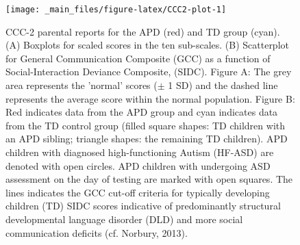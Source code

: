 \documentclass[a4paper, twoside]{templates/ociamthesis}
\begin{document}
\begin{figure}

{\centering \texttt{[image: \_main\_files/figure-latex/CCC2-plot-1]} 

}

\caption{CCC-2 parental reports for the APD (red) and TD group (cyan). (A) Boxplots for scaled scores in the ten sub-scales. (B) Scatterplot for General Communication Composite (GCC) as a function of Social-Interaction Deviance Composite, (SIDC). Figure A: The grey area represents the 'normal' scores ($\pm$ 1 SD) and the dashed line represents the average score within the normal population. Figure B: Red indicates data from the APD group and cyan indicates data from the TD control group (filled square shapes: TD children with an APD sibling; triangle shapes: the remaining TD children). APD children with diagnosed high-functioning Autism (HF-ASD) are denoted with open circles. APD children with undergoing ASD assessment on the day of testing are marked with open squares. The lines indicates the GCC cut-off criteria for typically developing children (TD) SIDC scores indicative of predominantly structural developmental language disorder (DLD) and more social communication deficits (cf. Norbury, 2013).}\label{fig:CCC2-plot}
\end{figure}
\end{document}
